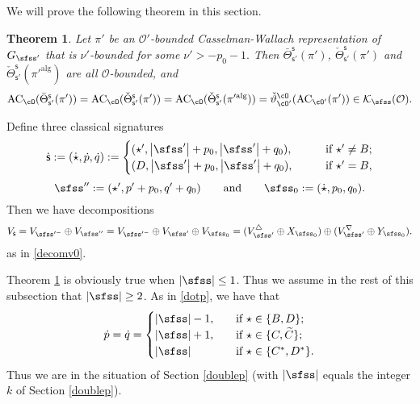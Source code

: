 \documentclass[12pt,a4paper]{amsart}
\def\abs#1{\left|{#1}\right|}
\newcommand{\CK}{{\mathcal {K}}}
\newcommand{\CO}{{\mathcal {O}}}
\newcommand{\g}{\mathfrak g}
\numberwithin{equation}{section}
\newtheorem{thm}{Theorem}[section]
\theoremstyle{remark}
\def\Thetab{\bar{\Theta}}
\begin{document}
We will prove the following theorem in this section.
\begin{thm}\label{thm:GDS.AC}
  Let $\pi'$ be an $\CO'$-bounded Casselman-Wallach representation of $G_{\sfss'}$  that is  $\nu'$-bounded for some
$
  \nu'>
 -p_0-1.
$
Then $\Thetab_{\mathsf s'}^{\mathsf s}(\pi')$, $\check \Theta_{\mathsf s'}^{\mathsf s}(\pi')$  and $\check \Theta_{\mathsf s'}^{\mathsf s}(\pi'^{\mathrm{alg}})$ are all $\CO$-bounded,  and
    \[
  \mathrm{AC}_{\cO}(\Thetab_{\mathsf s'}^{\mathsf s}(\pi'))=    \mathrm{AC}_{\cO}(\check \Theta_{\mathsf s'}^{\mathsf s}(\pi'))= \mathrm{AC}_{\cO}(\check \Theta_{\mathsf s'}^{\mathsf s}(\pi'^{\mathrm{alg}}))=   \check \vartheta_{\cO'}^\cO(\mathrm{AC}_{\cO'}(\pi'))\in \CK_\sfss(\CO).
  \]
\end{thm}







  Define three classical signatures
\[
  \dsfss:=(\dot \star, \dot p, \dot q):=\begin{cases}
    (\star', \abs{\sfss'}+p_0,  \abs{\sfss'}+q_0), \qquad  &\textrm{if $\star'\neq B$}; \\
        (D, \abs{\sfss'}+p_0,  \abs{\sfss'}+q_0),\qquad  &\textrm{if $\star'=B$},
  \end{cases}
\]
\[
  \sfss'':=(\star', p'+p_0, q'+q_0)\qquad\textrm{and}\qquad \sfss_0:=(\dot \star, p_0, q_0). %
  \]
Then we have decompositions
\[
  V_{\dsfss}=V_{\sfss'^-}\oplus V_{\sfss''}= V_{\sfss'^-}\oplus V_{\sfss'}\oplus  V_{\sfss_0}= (V_{\sfss'}^\triangle \oplus X_{\sfss_0})\oplus (V_{\sfss'}^\nabla \oplus Y_{\sfss_0}).
\]
as in \eqref{decomv0}.

Theorem \ref{thm:GDS.AC} is obviously true when $\abs{\sfss}\leq 1$. Thus  we  assume in the rest of this subsection that $\abs{\sfss}\geq 2$. As in \eqref{dotp}, we have that
\[
 \dot p=\dot q= \begin{cases}
 \abs{\sfss}-1,\quad   &\textrm{if } \star\in \{B,D\};\\
 \abs{\sfss}+1,  & \textrm{if $\star\in \{C, \widetilde C\}$;}\\
 \abs{\sfss} & \textrm{if $ \star\in\{C^*,D^*\}$.}
\end{cases}
\]
Thus we are in the situation of
Section \ref{doublep} (with $\abs{\sfss}$ equals the integer $k$ of Section \ref{doublep}).
\end{document}
